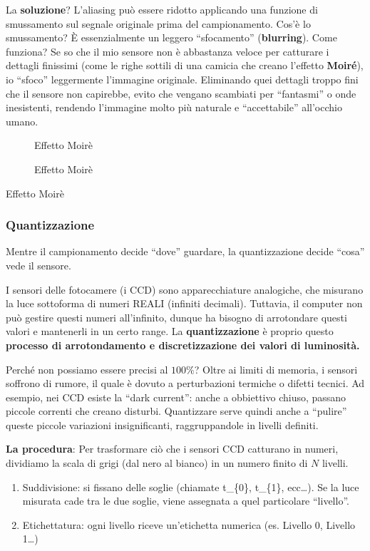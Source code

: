 \documentclass[
]{article}
\providecommand{\tightlist}{%
  \setlength{\itemsep}{0pt}\setlength{\parskip}{0pt}}
\begin{document}
La \textbf{soluzione}? L'aliasing può essere ridotto applicando una funzione di smussamento sul segnale originale prima del campionamento.
Cos'è lo smussamento? È essenzialmente un leggero ``sfocamento'' (\textbf{blurring}).
Come funziona? Se so che il mio sensore non è abbastanza veloce per catturare i dettagli finissimi (come le righe sottili di una camicia che creano l'effetto \textbf{Moiré}), io ``sfoco'' leggermente l'immagine originale. Eliminando quei dettagli troppo fini che il sensore non capirebbe, evito che vengano scambiati per ``fantasmi'' o onde inesistenti, rendendo l'immagine molto più naturale e ``accettabile'' all'occhio umano.

\begin{figure}
\centering
{Effetto Moirè}
\caption{Effetto Moirè}
\end{figure}

Effetto Moirè

\hypertarget{quantizzazione}{%
\subsubsection{Quantizzazione}\label{quantizzazione}}

Mentre il campionamento decide ``dove'' guardare, la quantizzazione decide ``cosa'' vede il sensore.

I sensori delle fotocamere (i CCD) sono apparecchiature analogiche, che misurano la luce sottoforma di numeri REALI (infiniti decimali). Tuttavia, il computer non può gestire questi numeri all'infinito, dunque ha bisogno di arrotondare questi valori e mantenerli in un certo range. La \textbf{quantizzazione} è proprio questo \textbf{processo di arrotondamento e discretizzazione dei valori di luminosità.}

Perché non possiamo essere precisi al \(100 \%\)?
Oltre ai limiti di memoria, i sensori soffrono di rumore, il quale è dovuto a perturbazioni termiche o difetti tecnici. Ad esempio, nei CCD esiste la ``dark current'': anche a obbiettivo chiuso, passano piccole correnti che creano disturbi. Quantizzare serve quindi anche a ``pulire'' queste piccole variazioni insignificanti, raggruppandole in livelli definiti.

\textbf{La procedura}:
Per trasformare ciò che i sensori CCD catturano in numeri, dividiamo la scala di grigi (dal nero al bianco) in un numero finito di \(N\) livelli.

\begin{enumerate}
\def\labelenumi{\arabic{enumi}.}
\tightlist
\item
  Suddivisione: si fissano delle soglie (chiamate t\_\{0\}, t\_\{1\}, ecc\ldots). Se la luce misurata cade tra le due soglie, viene assegnata a quel particolare ``livello''.
\item
  Etichettatura: ogni livello riceve un'etichetta numerica (es. Livello 0, Livello 1\ldots)
\end{enumerate}
\end{document}
